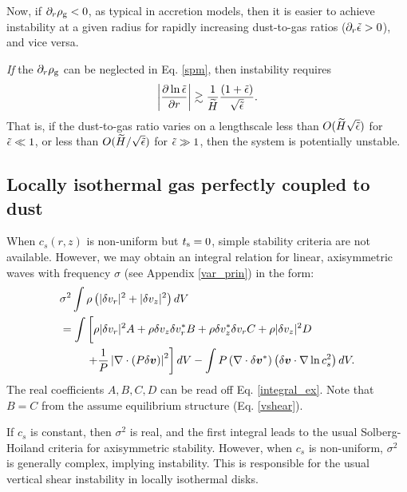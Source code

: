 Now, if $\partial_r\rho_\mathrm{g}<0$, as typical in
accretion models, then it is easier to achieve instability at a given
radius for rapidly increasing dust-to-gas ratios ($\partial_r\tilde{\epsilon} >
0$), and vice versa. 

\emph{If} the $\partial_r\rho_\mathrm{g}$ can be neglected in Eq. \ref{spm},
then instability requires
\begin{align}
  \left|\frac{\partial\ln{\tilde{\epsilon}}}{\partial r}\right| \gtrsim
  \frac{1}{\widetilde{H}}\frac{\left(1+\tilde{\epsilon}\right)}{\sqrt{\tilde{\epsilon}}}. 
\end{align}
That is, if the dust-to-gas ratio varies on a lengthscale less than
$O(\widetilde{H}\sqrt{\tilde{\epsilon}})$ for $\tilde{\epsilon}\ll 1$, or less than
$O(\widetilde{H}/\sqrt{\tilde{\epsilon}})$ for $\tilde{\epsilon}\gg 1$, then the system is
potentially unstable.   



\subsection{Locally isothermal gas perfectly coupled to dust} 
When $c_s(r,z)$ is non-uniform but $t_\mathrm{s}=0$, simple stability
criteria are not available. However, we may obtain an integral
relation for linear, axisymmetric waves with frequency $\sigma$ (see
Appendix \ref{var_prin}) in the form:  
\begin{align}
&  \sigma^2\int\rho\left(|\dd v_r|^2 + |\dd v_z|^2\right)dV \notag\\
&= \int\left[ \rho
  |\dd v_r|^2A + \rho  \dd v_z \dd v_r^* B + \rho \dd v_z^*\dd v_r C +
  \rho |\dd v_z|^2 D\phantom{\frac{1}{1}}\right. \notag\\
&\phantom{===}  \left. + \frac{1}{P}\left|\nabla\cdot\left(P\dd
  \bm{v}\right)\right|^2\right]dV - \int P
  \left(\nabla\cdot\dd\bm{v}^*\right)\left(\dd\bm{v}\cdot\nabla\ln{c_s^2}\right)dV.
\end{align}
The real coefficients $A,B,C,D$ can be read off
Eq. \ref{integral_ex}. Note that $B=C$ from the assume equilibrium
structure (Eq. \ref{vshear}).  

If $c_s$ is constant, then $\sigma^2$ is real, and 
the first integral leads to the usual Solberg-Hoiland criteria for
axisymmetric stability. However, when $c_s$ is non-uniform, $\sigma^2$
is generally complex, implying instability. This is responsible for
the usual vertical shear instability in locally isothermal disks. 

